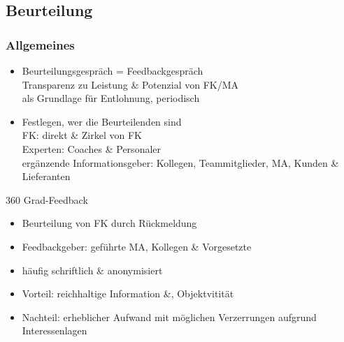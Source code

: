 \documentclass{cheatsheet}
\begin{document}
    \subsection{Beurteilung}
    \begin{normbox}{\subsubsection{Allgemeines}}
        \begin{itemize}
            \item Beurteilungsgespräch = Feedbackgespräch\\
            \ra Transparenz zu Leistung \& Potenzial von FK/MA\\
            \ra als Grundlage für Entlohnung, periodisch
            \item Festlegen, wer die Beurteilenden sind\\
            \ra FK: direkt \& Zirkel von FK\\
            \ra Experten: Coaches \& Personaler\\
            \ra ergänzende Informationsgeber: Kollegen, Teammitglieder, MA, Kunden \& Lieferanten
        \end{itemize}
    \end{normbox}
    \begin{hintbox}{360 Grad-Feedback}
        \begin{itemize}
            \item Beurteilung von FK durch Rückmeldung
            \item Feedbackgeber: geführte MA, Kollegen \& Vorgesetzte
            \item häufig schriftlich \& anonymisiert
            \item Vorteil: reichhaltige Information \&, Objektvitität
            \item Nachteil: erheblicher Aufwand mit möglichen Verzerrungen aufgrund Interessenlagen
        \end{itemize}
    \end{hintbox}
\end{document}
